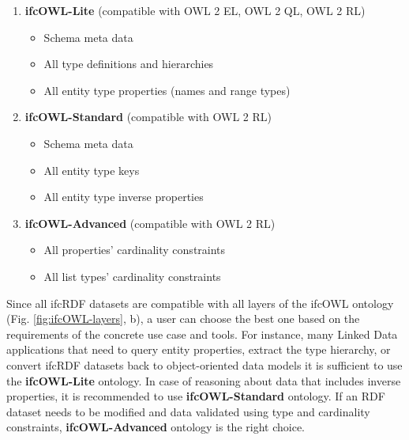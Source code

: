 \begin{enumerate}
\item
    \textbf{ifcOWL-Lite} (compatible with OWL 2 EL, OWL 2 QL, OWL 2 RL)
    \begin{itemize}
        \item Schema meta data
        \item All type definitions and hierarchies
        \item All entity type properties (names and range types)
    \end{itemize}
\item
    \textbf{ifcOWL-Standard} (compatible with OWL 2 RL)
    \begin{itemize}
        \item Schema meta data
        \item All entity type keys
        \item All entity type inverse properties
    \end{itemize}
\item
    \textbf{ifcOWL-Advanced} (compatible with OWL 2 RL)
    \begin{itemize}
        \item All properties' cardinality constraints
        \item All list types' cardinality constraints
    \end{itemize}
\end{enumerate}

Since all ifcRDF datasets are compatible with all layers of the ifcOWL ontology (Fig. \ref{fig:ifcOWL-layers}, b), a user can choose the best one based on the requirements of the concrete use case and tools. For instance, many Linked Data applications that need to query entity properties, extract the type hierarchy, or convert ifcRDF datasets back to object-oriented data models it is sufficient to use the \textbf{ifcOWL-Lite} ontology. In case of reasoning about data that includes inverse properties, it is recommended to use \textbf{ifcOWL-Standard} ontology. If an RDF dataset needs to be modified and data validated using type and cardinality constraints, \textbf{ifcOWL-Advanced} ontology is the right choice.


% 

